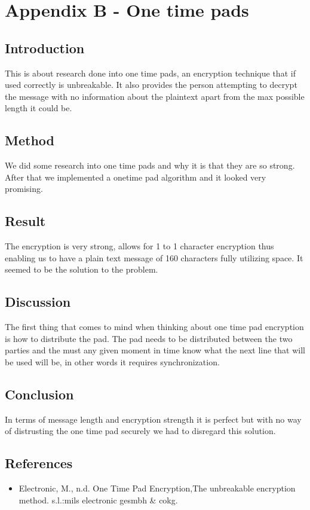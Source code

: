 \section{Appendix B - One time pads}

\subsection*{Introduction}

This is about research done into one time pads, an encryption technique that if used correctly is unbreakable.  It also provides the person attempting to decrypt the message with no information about the plaintext apart from the max possible length it could be.
\subsection*{Method}

We did some research into one time pads and why it is that they are so strong. After that we implemented a onetime pad algorithm and it looked very promising.
\subsection*{Result}

The encryption is very strong, allows for 1 to 1 character encryption thus enabling us to have a plain text message of 160 characters fully utilizing space. It seemed to be the solution to the problem.
\subsection*{Discussion}

The first thing that comes to mind when thinking about one time pad encryption is how to distribute the pad. The pad needs to be distributed between the two parties and the must any given moment in time know what the next line that will be used will be, in other words it requires synchronization.
\subsection*{Conclusion}

In terms of message length and encryption strength it is perfect but with no way of distrusting the one time pad securely we had to disregard this solution.
\subsection*{References}
\begin{itemize}
\item Electronic, M., n.d. One Time Pad Encryption,The unbreakable encryption method. s.l.:mils electronic gesmbh \& cokg.
\end{itemize}